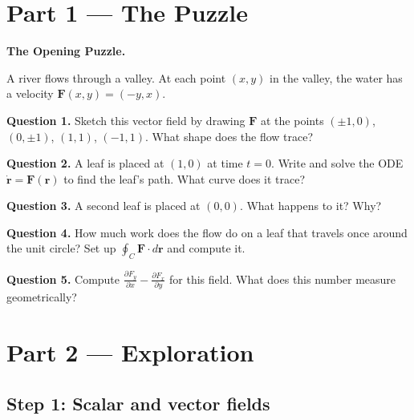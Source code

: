 \documentclass[12pt,a4paper]{article}
\begin{document}
\newpage

\section{Part 1 \texorpdfstring{---}{--} The Puzzle}

\begin{puzzlebox}
\textbf{The Opening Puzzle.}

A river flows through a valley. At each point $(x,y)$ in the valley, the water has a velocity $\mathbf{F}(x,y) = (-y, x)$.

\medskip
\textbf{Question 1.} Sketch this vector field by drawing $\mathbf{F}$ at the points $(\pm 1, 0)$, $(0,\pm 1)$, $(1,1)$, $(-1,1)$. What shape does the flow trace?

\textbf{Question 2.} A leaf is placed at $(1,0)$ at time $t=0$. Write and solve the ODE $\dot{\mathbf{r}} = \mathbf{F}(\mathbf{r})$ to find the leaf's path. What curve does it trace?

\textbf{Question 3.} A second leaf is placed at $(0,0)$. What happens to it? Why?

\textbf{Question 4.} How much work does the flow do on a leaf that travels once around the unit circle? Set up $\oint_C \mathbf{F}\cdot d\mathbf{r}$ and compute it.

\textbf{Question 5.} Compute $\frac{\partial F_y}{\partial x} - \frac{\partial F_x}{\partial y}$ for this field. What does this number measure geometrically?
\end{puzzlebox}

\section{Part 2 \texorpdfstring{---}{--} Exploration}

\subsection{Step 1: Scalar and vector fields}
\end{document}
